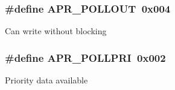 \subsubsection[{\texorpdfstring{A\+P\+R\+\_\+\+P\+O\+L\+L\+O\+UT}{APR_POLLOUT}}]{\setlength{\rightskip}{0pt plus 5cm}\#define A\+P\+R\+\_\+\+P\+O\+L\+L\+O\+UT~0x004}\hypertarget{group__pollopts_ga6fb703db1d11e2c5f66d8c6146e56053}{}\label{group__pollopts_ga6fb703db1d11e2c5f66d8c6146e56053}
Can write without blocking 
\subsubsection[{\texorpdfstring{A\+P\+R\+\_\+\+P\+O\+L\+L\+P\+RI}{APR_POLLPRI}}]{\setlength{\rightskip}{0pt plus 5cm}\#define A\+P\+R\+\_\+\+P\+O\+L\+L\+P\+RI~0x002}\hypertarget{group__pollopts_ga196c38e1914077c4c9a0cf3ce87f1b9c}{}\label{group__pollopts_ga196c38e1914077c4c9a0cf3ce87f1b9c}
Priority data available 